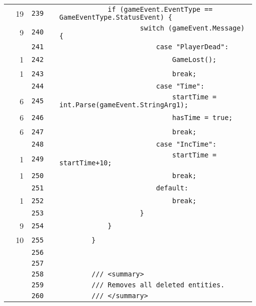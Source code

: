 \documentclass[a4paper,landscape,10pt]{article}
\begin{document}
\begin{longtable}[l]{lrrll}
\cellcolor{green} & 19 & \verb~239~ & & \verb~            if (gameEvent.EventType == GameEventType.StatusEvent) {~\\
\cellcolor{green} & 9 & \verb~240~ & & \verb~                    switch (gameEvent.Message) {~\\
\cellcolor{gray} &  & \verb~241~ & & \verb~                        case "PlayerDead":~\\
\cellcolor{green} & 1 & \verb~242~ & & \verb~                            GameLost();~\\
\cellcolor{green} & 1 & \verb~243~ & & \verb~                            break;~\\
\cellcolor{gray} &  & \verb~244~ & & \verb~                        case "Time":~\\
\cellcolor{green} & 6 & \verb~245~ & & \verb~                            startTime = int.Parse(gameEvent.StringArg1);~\\
\cellcolor{green} & 6 & \verb~246~ & & \verb~                            hasTime = true;~\\
\cellcolor{green} & 6 & \verb~247~ & & \verb~                            break;~\\
\cellcolor{gray} &  & \verb~248~ & & \verb~                        case "IncTime":~\\
\cellcolor{green} & 1 & \verb~249~ & & \verb~                            startTime = startTime+10;~\\
\cellcolor{green} & 1 & \verb~250~ & & \verb~                            break;~\\
\cellcolor{gray} &  & \verb~251~ & & \verb~                        default:~\\
\cellcolor{green} & 1 & \verb~252~ & & \verb~                            break;~\\
\cellcolor{gray} &  & \verb~253~ & & \verb~                    }~\\
\cellcolor{green} & 9 & \verb~254~ & & \verb~            }~\\
\cellcolor{green} & 10 & \verb~255~ & & \verb~        }~\\
\cellcolor{gray} &  & \verb~256~ & & \verb~~\\
\cellcolor{gray} &  & \verb~257~ & & \verb~~\\
\cellcolor{gray} &  & \verb~258~ & & \verb~        /// <summary>~\\
\cellcolor{gray} &  & \verb~259~ & & \verb~        /// Removes all deleted entities.~\\
\cellcolor{gray} &  & \verb~260~ & & \verb~        /// </summary>~\\

\end{longtable}
\end{document}
